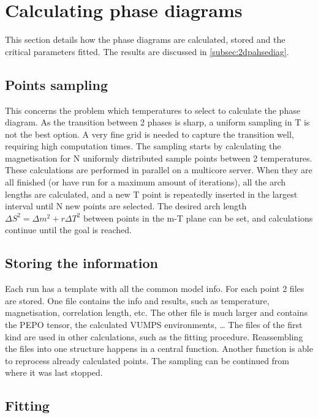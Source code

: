 \section{Calculating phase diagrams} \label{sec:phase_diag}

This section details how the phase diagrams are calculated, stored and the critical parameters fitted. The results are discussed in \cref{subsec:2dpahsediag}.

\subsection{Points sampling}

This concerns the problem which temperatures to select to calculate the phase diagram. As  the transition between 2 phases is sharp, a uniform sampling in T is not the best option. A very fine grid is needed to capture the transition well, requiring high computation times. The sampling starts by calculating the magnetisation for N  uniformly distributed sample points between 2 temperatures. These calculations are performed in parallel on a multicore server. When they are all finished (or have run for a maximum amount of iterations), all the arch lengths are calculated, and a new T point is  repeatedly inserted in the largest interval until N new points are selected. The desired arch length $\Delta S ^2= \Delta m ^2 + r \Delta T ^2 $ between points in the m-T plane can be set, and calculations continue until the goal is reached.

\subsection{Storing the information}

Each run has a template with all the common model info. For each point 2 files are stored. One file contains the info and results, such as temperature, magnetisation, correlation length, etc. The other file is much larger and contains the PEPO tensor, the calculated \Gls{VUMPS} environments, \dots
The files of the first kind are used in other calculations, such as the fitting procedure.  Reassembling the files into one structure happens in a central function. Another function is able to reprocess already calculated points. The sampling can be continued from where it was last stopped.

\subsection{Fitting}\label{subsec:qphasediag}

